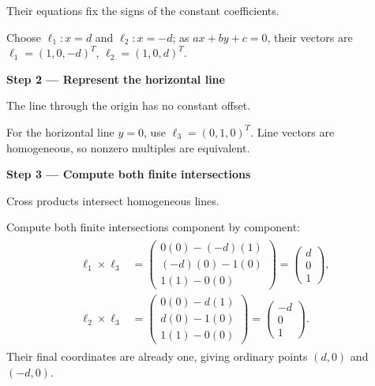 \documentclass[letterpaper,11pt,english,openany,oneside]{jupyterBook}
\begin{document}
\sphinxAtStartPar
{} Their equations fix the signs of the constant coefficients.

\sphinxAtStartPar
Choose {\color{QuizMathBlue} \(\ell_1:x=d\)} and {\color{QuizMathBlue} \(\ell_2:x=-d\)}; as {\color{QuizMathBlue} \(ax+by+c=0\)}, their vectors are {\color{QuizMathBlue} \(\boxed{\ell_1=(1,0,-d)^T}\)}, {\color{QuizMathBlue} \(\boxed{\ell_2=(1,0,d)^T}\)}.

\par

\par\medskip{}
{\color{QuizStepRed}\bfseries Step 2 — Represent the horizontal line}\par\smallskip

\sphinxAtStartPar
{} The line through the origin has no constant offset.

\sphinxAtStartPar
For the horizontal line {\color{QuizMathBlue} \(y=0\)}, use {\color{QuizMathBlue} \(\boxed{\ell_3=(0,1,0)^T}\)}. Line vectors are homogeneous, so nonzero multiples are equivalent.

\par

\par\medskip{}
{\color{QuizStepRed}\bfseries Step 3 — Compute both finite intersections}\par\smallskip

\sphinxAtStartPar
{} Cross products intersect homogeneous lines.

\sphinxAtStartPar
Compute both finite intersections component by component:
{\color{QuizMathBlue} \begin{equation*}
\begin{split}
\begin{aligned}
\ell_1\times\ell_3&=\begin{pmatrix}0(0)-(-d)(1)\\(-d)(0)-1(0)\\1(1)-0(0)\end{pmatrix}
=\begin{pmatrix}d\\0\\1\end{pmatrix},\\
\ell_2\times\ell_3&=\begin{pmatrix}0(0)-d(1)\\d(0)-1(0)\\1(1)-0(0)\end{pmatrix}
=\begin{pmatrix}-d\\0\\1\end{pmatrix}.
\end{aligned}
\end{split}
\end{equation*}}
\sphinxAtStartPar
Their final coordinates are already one, giving ordinary points {\color{QuizMathBlue} \((d,0)\)} and {\color{QuizMathBlue} \((-d,0)\)}.
\end{document}

